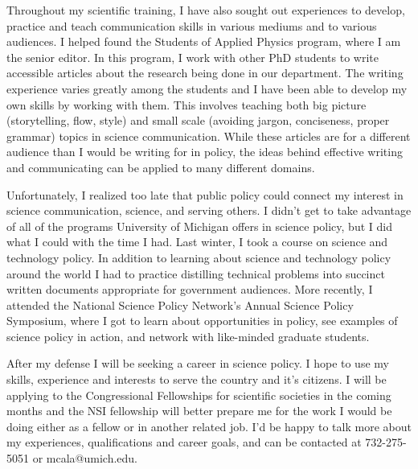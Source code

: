 Throughout my scientific training, I have also sought out experiences to develop, practice and teach communication skills in various mediums and to various audiences. I helped found the Students of Applied Physics program, where I am the senior editor. In this program, I work with other PhD students to write accessible articles about the research being done in our department. The writing experience varies greatly among the students and I have been able to develop my own skills by working with them. This involves teaching both big picture (storytelling, flow, style) and small scale (avoiding jargon, conciseness, proper grammar) topics in science communication. While these articles are for a different audience than I would be writing for in policy, the ideas behind effective writing and communicating can be applied to many different domains.

Unfortunately, I realized too late that public policy could connect my interest in science communication, science, and serving others. I didn't get to take advantage of all of the programs University of Michigan offers in science policy, but I did what I could with the time I had. Last winter, I took a course on science and technology policy. In addition to learning about science and technology policy around the world I had to practice distilling technical problems into succinct written documents appropriate for government audiences. More recently, I attended the National Science Policy Network's Annual Science Policy Symposium, where I got to learn about opportunities in policy, see examples of science policy in action, and network with like-minded graduate students.

After my defense I will be seeking a career in science policy. I hope to use my skills, experience and interests to serve the country and it's citizens. I will be applying to the Congressional Fellowships for scientific societies in the coming months and the NSI fellowship will better prepare me for the work I would be doing either as a fellow or in another related job. I'd be happy to talk more about my experiences, qualifications and career goals, and can be contacted at 732-275-5051 or mcala@umich.edu.

\makeletterclosing
\restoregeometry
